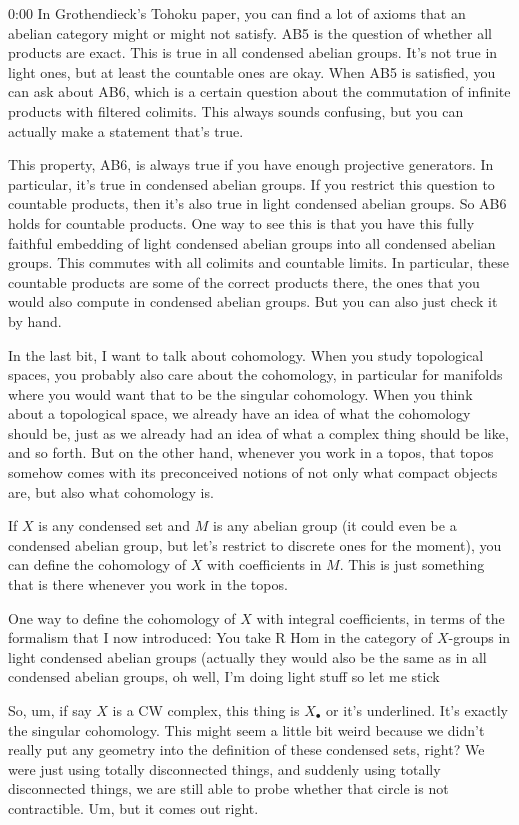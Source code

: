 \begin{unfinished}{0:00}
In Grothendieck's Tohoku paper, you can find a lot of axioms that an abelian category might or might not satisfy. AB5 is the question of whether all products are exact. This is true in all condensed abelian groups. It's not true in light ones, but at least the countable ones are okay. When AB5 is satisfied, you can ask about AB6, which is a certain question about the commutation of infinite products with filtered colimits. This always sounds confusing, but you can actually make a statement that's true.

This property, AB6, is always true if you have enough projective generators. In particular, it's true in condensed abelian groups. If you restrict this question to countable products, then it's also true in light condensed abelian groups. So AB6 holds for countable products. One way to see this is that you have this fully faithful embedding of light condensed abelian groups into all condensed abelian groups. This commutes with all colimits and countable limits. In particular, these countable products are some of the correct products there, the ones that you would also compute in condensed abelian groups. But you can also just check it by hand.

In the last bit, I want to talk about cohomology. When you study topological spaces, you probably also care about the cohomology, in particular for manifolds where you would want that to be the singular cohomology. When you think about a topological space, we already have an idea of what the cohomology should be, just as we already had an idea of what a complex thing should be like, and so forth. But on the other hand, whenever you work in a topos, that topos somehow comes with its preconceived notions of not only what compact objects are, but also what cohomology is.

If $X$ is any condensed set and $M$ is any abelian group (it could even be a condensed abelian group, but let's restrict to discrete ones for the moment), you can define the cohomology of $X$ with coefficients in $M$. This is just something that is there whenever you work in the topos.

One way to define the cohomology of $X$ with integral coefficients, in terms of the formalism that I now introduced: You take R Hom in the category of $X$-groups in light condensed abelian groups (actually they would also be the same as in all condensed abelian groups, oh well, I'm doing light stuff so let me stick

So, um, if say $X$ is a CW complex, this thing is $X_\bullet$ or it's underlined. It's exactly the singular cohomology. This might seem a little bit weird because we didn't really put any geometry into the definition of these condensed sets, right? We were just using totally disconnected things, and suddenly using totally disconnected things, we are still able to probe whether that circle is not contractible. Um, but it comes out right.


\end{unfinished}
